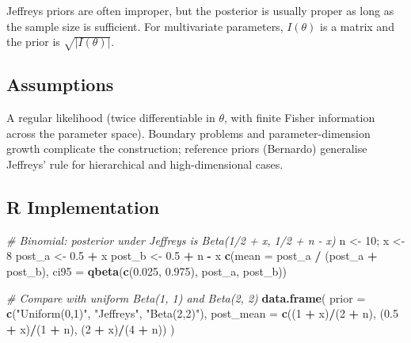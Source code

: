 \documentclass[
]{article}
\newenvironment{Shaded}{\begin{snugshade}}{\end{snugshade}}
\newcommand{\AttributeTok}[1]{\textcolor[rgb]{0.13,0.29,0.53}{#1}}
\newcommand{\CommentTok}[1]{\textcolor[rgb]{0.56,0.35,0.01}{\textit{#1}}}
\newcommand{\DecValTok}[1]{\textcolor[rgb]{0.00,0.00,0.81}{#1}}
\newcommand{\FloatTok}[1]{\textcolor[rgb]{0.00,0.00,0.81}{#1}}
\newcommand{\FunctionTok}[1]{\textcolor[rgb]{0.13,0.29,0.53}{\textbf{#1}}}
\newcommand{\NormalTok}[1]{#1}
\newcommand{\OtherTok}[1]{\textcolor[rgb]{0.56,0.35,0.01}{#1}}
\newcommand{\SpecialCharTok}[1]{\textcolor[rgb]{0.81,0.36,0.00}{\textbf{#1}}}
\newcommand{\StringTok}[1]{\textcolor[rgb]{0.31,0.60,0.02}{#1}}
\begin{document}
Jeffreys priors are often improper, but the posterior is usually proper
as long as the sample size is sufficient. For multivariate parameters,
\(I(\theta)\) is a matrix and the prior is \(\sqrt{|I(\theta)|}\).

\subsection{Assumptions}\label{assumptions}

A regular likelihood (twice differentiable in \(\theta\), with finite
Fisher information across the parameter space). Boundary problems and
parameter-dimension growth complicate the construction; reference priors
(Bernardo) generalise Jeffreys' rule for hierarchical and
high-dimensional cases.

\subsection{R Implementation}\label{r-implementation}

\begin{Shaded}
\begin{Highlighting}[]
\CommentTok{\# Binomial: posterior under Jeffreys is Beta(1/2 + x, 1/2 + n {-} x)}
\NormalTok{n }\OtherTok{\textless{}{-}} \DecValTok{10}\NormalTok{; x }\OtherTok{\textless{}{-}} \DecValTok{8}
\NormalTok{post\_a }\OtherTok{\textless{}{-}} \FloatTok{0.5} \SpecialCharTok{+}\NormalTok{ x}
\NormalTok{post\_b }\OtherTok{\textless{}{-}} \FloatTok{0.5} \SpecialCharTok{+}\NormalTok{ n }\SpecialCharTok{{-}}\NormalTok{ x}
\FunctionTok{c}\NormalTok{(}\AttributeTok{mean =}\NormalTok{ post\_a }\SpecialCharTok{/}\NormalTok{ (post\_a }\SpecialCharTok{+}\NormalTok{ post\_b),}
  \AttributeTok{ci95 =} \FunctionTok{qbeta}\NormalTok{(}\FunctionTok{c}\NormalTok{(}\FloatTok{0.025}\NormalTok{, }\FloatTok{0.975}\NormalTok{), post\_a, post\_b))}

\CommentTok{\# Compare with uniform Beta(1, 1) and Beta(2, 2)}
\FunctionTok{data.frame}\NormalTok{(}
  \AttributeTok{prior =} \FunctionTok{c}\NormalTok{(}\StringTok{"Uniform(0,1)"}\NormalTok{, }\StringTok{"Jeffreys"}\NormalTok{, }\StringTok{"Beta(2,2)"}\NormalTok{),}
  \AttributeTok{post\_mean =} \FunctionTok{c}\NormalTok{((}\DecValTok{1} \SpecialCharTok{+}\NormalTok{ x)}\SpecialCharTok{/}\NormalTok{(}\DecValTok{2} \SpecialCharTok{+}\NormalTok{ n), (}\FloatTok{0.5} \SpecialCharTok{+}\NormalTok{ x)}\SpecialCharTok{/}\NormalTok{(}\DecValTok{1} \SpecialCharTok{+}\NormalTok{ n), (}\DecValTok{2} \SpecialCharTok{+}\NormalTok{ x)}\SpecialCharTok{/}\NormalTok{(}\DecValTok{4} \SpecialCharTok{+}\NormalTok{ n))}
\NormalTok{)}
\end{Highlighting}
\end{Shaded}
\end{document}
